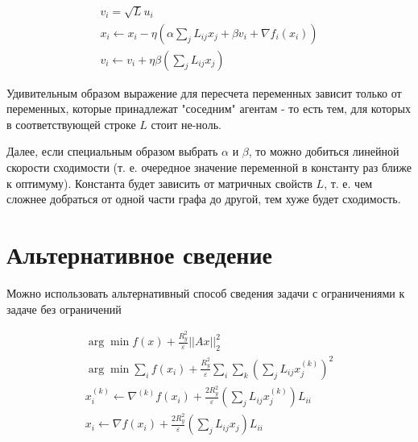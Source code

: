 \documentclass[a4paper, 10pt]{article}
\begin{document}
\begin{gather}
    v_i = \sqrt{L} u_i \\
    x_{i} \leftarrow x_i - \eta(\alpha\sum_{j} L_{ij} x_{j} + \beta v_i + \nabla f_i(x_i)) \\
    v_{i} \leftarrow v_i + \eta\beta(\sum_j L_{ij}x_j)
\end{gather}


Удивительным образом выражение для пересчета переменных зависит только от переменных, которые принадлежат "соседним" агентам - то есть тем, для которых в соответствующей строке $L$ стоит не-ноль.

Далее, если специальным образом выбрать $\alpha$ и $\beta$, то можно добиться линейной скорости сходимости (т. е. очередное значение переменной в константу раз ближе к оптимуму). Константа будет зависить от матричных свойств $L$, т. е. чем сложнее добраться от одной части графа до другой, тем хуже будет сходимость.

\section{Альтернативное сведение}

Можно использовать альтернативный способ сведения задачи с ограничениями к задаче без ограничений

\begin{gather}
    \arg \min f(x) + \frac{R_y^2}{\varepsilon} ||Ax||^2_2 \\ 
    \arg \min \sum_i f(x_i) + \frac{R_y^2}{\varepsilon} \sum_i \sum_k \left(\sum_j L_{ij} x_j^{(k)}\right)^2 \\ 
    x_i^{(k)} \leftarrow \nabla^{(k)} f(x_i) + \frac{2R_y^2}{\varepsilon} 
        \left(\sum_j L_{ij} x_j^{(k)} \right)L_{ii} \\
    x_i \leftarrow \nabla f(x_i) + \frac{2R_y^2}{\varepsilon} 
        \left(\sum_j L_{ij} x_j \right)L_{ii}
\end{gather}
\end{document}
